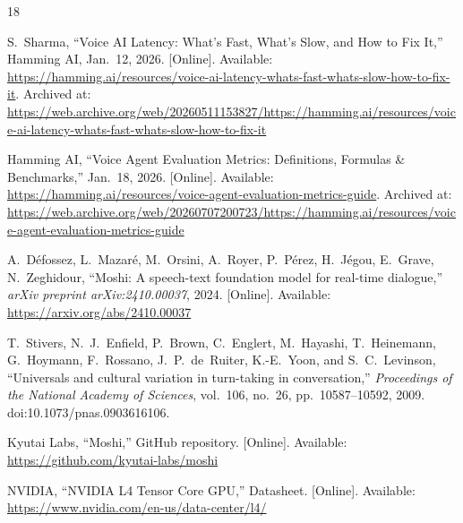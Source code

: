 \documentclass[journal]{IEEEtran}
\begin{document}

%
%
%
\begin{thebibliography}{18}

S.~Sharma, ``Voice AI Latency: What's Fast, What's Slow, and How to Fix It,'' Hamming AI, Jan.~12, 2026. [Online]. Available: \url{https://hamming.ai/resources/voice-ai-latency-whats-fast-whats-slow-how-to-fix-it}. Archived at: \url{https://web.archive.org/web/20260511153827/https://hamming.ai/resources/voice-ai-latency-whats-fast-whats-slow-how-to-fix-it}

Hamming AI, ``Voice Agent Evaluation Metrics: Definitions, Formulas \& Benchmarks,'' Jan.~18, 2026. [Online]. Available: \url{https://hamming.ai/resources/voice-agent-evaluation-metrics-guide}. Archived at: \url{https://web.archive.org/web/20260707200723/https://hamming.ai/resources/voice-agent-evaluation-metrics-guide}

A.~Défossez, L.~Mazaré, M.~Orsini, A.~Royer, P.~Pérez, H.~Jégou, E.~Grave, N.~Zeghidour, ``Moshi: A speech-text foundation model for real-time dialogue,'' \emph{arXiv preprint arXiv:2410.00037}, 2024. [Online]. Available: \url{https://arxiv.org/abs/2410.00037}

T.~Stivers, N.~J.~Enfield, P.~Brown, C.~Englert, M.~Hayashi, T.~Heinemann, G.~Hoymann, F.~Rossano, J.~P.~de~Ruiter, K.-E.~Yoon, and S.~C.~Levinson, ``Universals and cultural variation in turn-taking in conversation,'' \emph{Proceedings of the National Academy of Sciences}, vol.~106, no.~26, pp.~10587--10592, 2009. doi:10.1073/pnas.0903616106.

Kyutai Labs, ``Moshi,'' GitHub repository. [Online]. Available: \url{https://github.com/kyutai-labs/moshi}

NVIDIA, ``NVIDIA L4 Tensor Core GPU,'' Datasheet. [Online]. Available: \url{https://www.nvidia.com/en-us/data-center/l4/}


\end{thebibliography}
\end{document}
